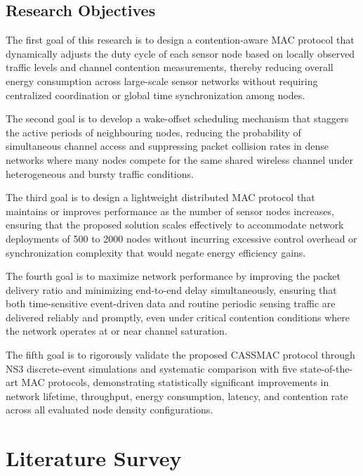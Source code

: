 \documentclass[a4paper]{cas-dc}
\numberwithin{equation}{section}
\begin{document}
\subsection{Research Objectives}
\label{subsec:objectives}

The first goal of this research is to design a contention-aware MAC protocol that dynamically adjusts the duty cycle of each sensor node based on locally observed traffic levels and channel contention measurements, thereby reducing overall energy consumption across large-scale sensor networks without requiring centralized coordination or global time synchronization among nodes.

The second goal is to develop a wake-offset scheduling mechanism that staggers the active periods of neighbouring nodes, reducing the probability of simultaneous channel access and suppressing packet collision rates in dense networks where many nodes compete for the same shared wireless channel under heterogeneous and bursty traffic conditions.

The third goal is to design a lightweight distributed MAC protocol that maintains or improves performance as the number of sensor nodes increases, ensuring that the proposed solution scales effectively to accommodate network deployments of 500 to 2000 nodes without incurring excessive control overhead or synchronization complexity that would negate energy efficiency gains.

The fourth goal is to maximize network performance by improving the packet delivery ratio and minimizing end-to-end delay simultaneously, ensuring that both time-sensitive event-driven data and routine periodic sensing traffic are delivered reliably and promptly, even under critical contention conditions where the network operates at or near channel saturation.

The fifth goal is to rigorously validate the proposed CASSMAC protocol through NS3 discrete-event simulations and systematic comparison with five state-of-the-art MAC protocols, demonstrating statistically significant improvements in network lifetime, throughput, energy consumption, latency, and contention rate across all evaluated node density configurations.
\section{Literature Survey}
\label{sec:litsurvey}
\end{document}
